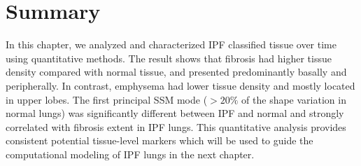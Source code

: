\section{Summary}
In this chapter, we analyzed and characterized IPF classified tissue over time using quantitative methods. The result shows that fibrosis had higher tissue density compared with normal tissue, and presented predominantly basally and peripherally. In contrast, emphysema had lower tissue density and mostly located in upper lobes. The first principal SSM mode ($>20\%$ of the shape variation in normal lungs) was significantly different between IPF and normal and strongly correlated with fibrosis extent in IPF lungs. This quantitative analysis provides consistent potential tissue-level markers which will be used to guide the computational modeling of IPF lungs in the next chapter.





